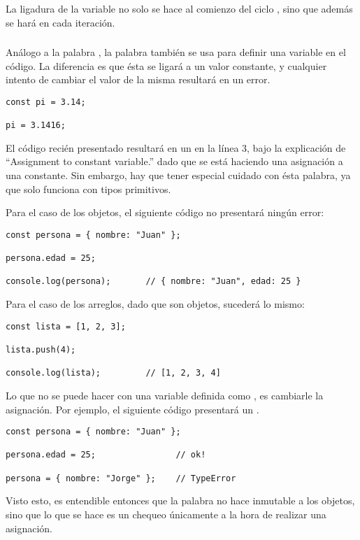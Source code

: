 La ligadura de la variable  no solo se hace al comienzo del ciclo , sino que además se hará en cada iteración.

\subsubsection{}

Análogo a la palabra , la palabra  también se usa para definir una variable en el código. La diferencia es que ésta se ligará a un valor constante, y cualquier intento de cambiar el valor de la misma resultará en un error.

\begin{lstlisting}[title={Intentando cambiar el valor a una constante}]
const pi = 3.14;

pi = 3.1416;
\end{lstlisting}

El código recién presentado resultará en un  en la línea 3, bajo la explicación de "`Assignment to constant variable.​​"' dado que se está haciendo una asignación a una constante. Sin embargo, hay que tener especial cuidado con ésta palabra, ya que solo funciona con tipos primitivos.

Para el caso de los objetos, el siguiente código no presentará ningún error:

\begin{lstlisting}[title={\code{const} sobre objetos}]
const persona = { nombre: "Juan" };

persona.edad = 25;

console.log(persona);		// ​​​​​{ nombre: "Juan", edad: 25 }​​​​​
\end{lstlisting}

Para el caso de los arreglos, dado que son objetos, sucederá lo mismo:

\begin{lstlisting}[title={\code{const} sobre arreglos}]
const lista = [1, 2, 3];

lista.push(4);

console.log(lista);			// [1, 2, 3, 4]
\end{lstlisting}

Lo que no se puede hacer con una variable definida como , es cambiarle la asignación. Por ejemplo, el siguiente código presentará un .

\begin{lstlisting}
const persona = { nombre: "Juan" };

persona.edad = 25;                // ok!

persona = { nombre: "Jorge" };    // TypeError
\end{lstlisting}

Visto esto, es entendible entonces que la palabra  no hace inmutable a los objetos, sino que lo que se hace es un chequeo únicamente a la hora de realizar una asignación.